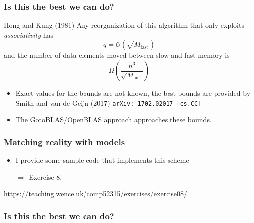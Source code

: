 \documentclass[presentation,aspectratio=43,10pt]{beamer}
\begin{document}
\begin{frame}
  \frametitle{Is this the best we can do?}
  \begin{theorem}{Hong and Kung (1981)}
    Any reorganization of this algorithm that only exploits
    \emph{associativity} has
    \begin{equation*}
      q = \mathcal{O}(\sqrt{M_\text{fast}})
    \end{equation*}
    and the number of data elements moved between slow and fast memory
    is
    \begin{equation*}
      \Omega\left(\frac{n^3}{\sqrt{M_\text{fast}}}\right)
    \end{equation*}
  \end{theorem}

  \begin{itemize}
  \item Exact values for the bounds are not known, the best bounds are
    provided by Smith and van de Geijn (2017) \texttt{arXiv:
      1702.02017 [cs.CC]}
  \item The GotoBLAS/OpenBLAS approach approaches these bounds.
  \end{itemize}
\end{frame}

\begin{frame}
  \frametitle{Matching reality with models}
  \begin{itemize}
  \item I provide some sample code that implements this scheme
  \item[$\Rightarrow$] Exercise 8.
  \end{itemize}
  \begin{center}
    \url{https://teaching.wence.uk/comp52315/exercises/exercise08/}
  \end{center}
\end{frame}


\begin{frame}
  \frametitle{Is this the best we can do?}
  \begin{center}
  \end{center}
\end{frame}
\end{document}
